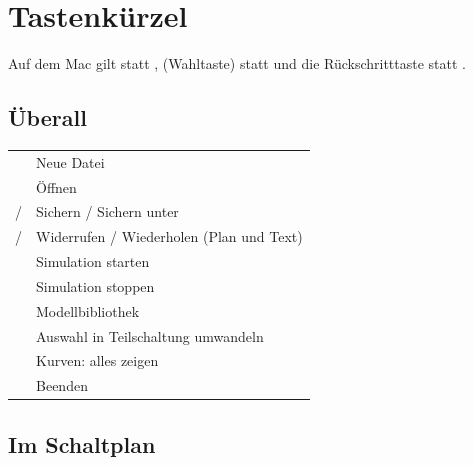 \chapter{Tastenkürzel}
\label{kap:tasten}

Auf dem Mac gilt  statt ,  (Wahltaste)
statt  und die Rückschritttaste statt .

\section*{Überall}

\begin{tabularx}{\textwidth}{@{}P{4.5cm}L@{}}
  \toprule
   & Neue Datei \\
   & Öffnen \\
   /  & Sichern / Sichern unter \\
   /  & Widerrufen / Wiederholen (Plan und Text) \\
   & Simulation starten \\
   & Simulation stoppen \\
   & Modellbibliothek \\
   & Auswahl in Teilschaltung umwandeln \\
   & Kurven: alles zeigen \\
   & Beenden \\
  \bottomrule
\end{tabularx}

\section*{Im Schaltplan}

